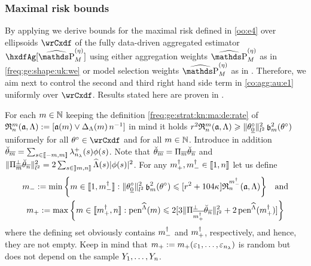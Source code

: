 \subsubsection{Maximal risk bounds}\label{freq:ge:strat:uk:ma}
\begin{te}
    By applying  we derive bounds for the maximal risk defined in \eqref{oo:e4} over ellipsoids  $\rwCxdf$ of the fully data-driven aggregated estimator $\hxdfAg[{\erWe[]}]$ using either aggregation weights $\erWe[]$
  as in \eqref{freq:ge:shape:uk:we} or model selection weights $\widehat{\P}_{M}^{(\eta)}$ as in .
  Therefore, we aim next to control the second and third right hand side term in \eqref{co:agg:au:e1} uniformly over $\rwCxdf$.
  Results stated here are proven in .
\end{te}
\begin{te}
  For each $\Di\in\Nz$ keeping 
the definition \ref{freq:ge:strat:kn:ma:de:rate} of
  $\daRa{\Di}{(\xdfCw[],\Lambda)}:=[\xdfCw\vee \DipenSv\,\ssY^{-1}]$ in
  mind it holds
$\xdfCr^2\daRa{\Di}{(\xdfCw[],\Lambda)}\geq\Vnormlp{\xdf_{\underline{0}}}^2\bias^2(\xdf)$
uniformely for all $\xdf\in\rwCxdf$ and for all
$\Di\in\Nz$.  Introduce in addition
$\dxdfPr=\sum_{s\in\nset{-\Di,\Di}}\hfedfmpI[(s)]\fydf[(s)]$. Note
that  $\dxdfPr=\Proj[\Di]\dxdfPr[\ssY]$
and $\Vnormlp{\ProjC[\Di]\dxdfPr[\ssY]}^2=2\sum_{s\in\nsetlo{\Di,\ssY}}\eiSv[(s)] \vert \fydf[(s)] \vert ^2$. For any $\pdDi,\mdDi\in\nset{1,\ssY}$ let us define 
\begin{multline}\label{au:mrb:de:*Di}
\mDi:=\min\set{\Di\in\nset{1,\mdDi}: \Vnormlp{\xdf_{\underline{0}}}^2\bias^2(\xdf)\leq
  [\xdfCr^2+104\cpen]\daRa{\mdDi}{(\xdfCw[],\Lambda)}}\quad\text{and}\\\pDi:=\max\set{\Di\in\nset{\pdDi,\ssY}:
   \peneSv \leq 2[3\Vnormlp{\ProjC[\pdDi]\dxdfPr[\ssY]}^2+2\peneSv[(\pdDi)]]}
\end{multline}
where  the defining set obviously contains $\mdDi$ and $\pdDi$, respectively, 
and hence, they are
not empty. Keep in mind that $\pDi:=\pDi(\rE_1,\dotsc,\rE_{\ssE})$ is
random but does not depend on the sample $\rY_1,\dotsc,\rY_{\ssY}$.
\end{te}
